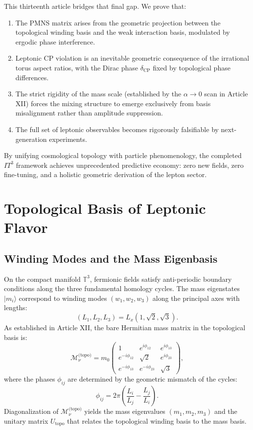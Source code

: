 \documentclass[12pt,a4paper]{article}
\begin{document}
This thirteenth article bridges that final gap. We prove that:
\begin{enumerate}
    \item The PMNS matrix arises from the geometric projection between the topological winding basis and the weak interaction basis, modulated by ergodic phase interference.
    \item Leptonic CP violation is an inevitable geometric consequence of the irrational torus aspect ratios, with the Dirac phase $\delta_{\text{CP}}$ fixed by topological phase differences.
    \item The strict rigidity of the mass scale (established by the $\alpha \to 0$ scan in Article XII) forces the mixing structure to emerge exclusively from basis misalignment rather than amplitude suppression.
    \item The full set of leptonic observables becomes rigorously falsifiable by next-generation experiments.
\end{enumerate}
By unifying cosmological topology with particle phenomenology, the completed $IT^3$ framework achieves unprecedented predictive economy: zero new fields, zero fine-tuning, and a holistic geometric derivation of the lepton sector.

\section{Topological Basis of Leptonic Flavor}
\subsection{Winding Modes and the Mass Eigenbasis}
On the compact manifold $\mathbb{T}^3$, fermionic fields satisfy anti-periodic boundary conditions along the three fundamental homology cycles. The mass eigenstates $|m_i\rangle$ correspond to winding modes $(w_1, w_2, w_3)$ along the principal axes with lengths:
\begin{equation}
    (L_1, L_2, L_3) = L_x (1, \sqrt{2}, \sqrt{3}).
\end{equation}
As established in Article XII, the bare Hermitian mass matrix in the topological basis is:
\begin{equation}
    \mathcal{M}_{\nu}^{\text{(topo)}} = m_0 \begin{pmatrix}
    1 & e^{i\phi_{12}} & e^{i\phi_{13}} \\
    e^{-i\phi_{12}} & \sqrt{2} & e^{i\phi_{23}} \\
    e^{-i\phi_{13}} & e^{-i\phi_{23}} & \sqrt{3}
    \end{pmatrix},
\end{equation}
where the phases $\phi_{ij}$ are determined by the geometric mismatch of the cycles:
\begin{equation}
    \phi_{ij} = 2\pi \left( \frac{L_i}{L_j} - \frac{L_j}{L_i} \right).
\end{equation}
Diagonalization of $\mathcal{M}_{\nu}^{\text{(topo)}}$ yields the mass eigenvalues $(m_1, m_2, m_3)$ and the unitary matrix $U_{\text{topo}}$ that relates the topological winding basis to the mass basis.
\end{document}
